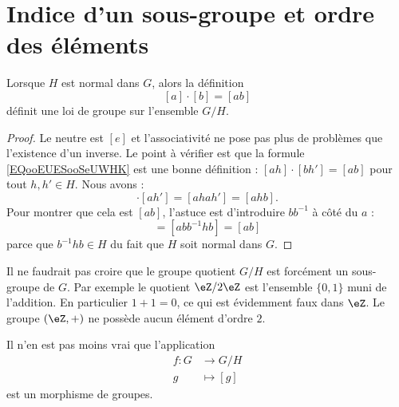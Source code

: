 \section{Indice d'un sous-groupe et ordre des éléments}

\begin{lemma}       \label{LEMooFNVRooRCkjLc}
    Lorsque \( H\) est normal dans \( G\), alors la définition
    \begin{equation}        \label{EQooEUESooSeUWHK}
        [a]\cdot[b]=[ab]
    \end{equation}
    définit une loi de groupe sur l'ensemble \( G/H\).
\end{lemma}

\begin{proof}
    Le neutre est \( [e]\) et l'associativité ne pose pas plus de problèmes que l'existence d'un inverse. Le point à vérifier est que la formule \eqref{EQooEUESooSeUWHK} est une bonne définition : \( [ah]\cdot [bh']=[ab]\) pour tout \( h,h'\in H\). Nous avons :
    \begin{equation}
        [ah]\cdot [ah']=[ahah']=[ahb].
    \end{equation}
    Pour montrer que cela est \( [ab]\), l'astuce est d'introduire \( bb^{-1}\) à côté du \( a\) :
    \begin{equation}
        [ahb]=[abb^{-1}hb]=[ab]
    \end{equation}
    parce que \( b^{-1} hb\in H\) du fait que \( H\) soit normal dans \( G\).
\end{proof}

\begin{example}      \label{EXooFNIKooHxePSs}
    Il ne faudrait pas croire que le groupe quotient \( G/H\) est forcément un sous-groupe de \( G\). Par exemple le quotient \( \eZ/2\eZ\) est l'ensemble \( \{ 0,1 \}\) muni de l'addition. En particulier \( 1+1=0\), ce qui est évidemment faux dans \( \eZ\). Le groupe \( (\eZ,+)\) ne possède aucun élément d'ordre \( 2\).

    Il n'en est pas moins vrai que l'application
    \begin{equation}
        \begin{aligned}
            f\colon G&\to G/H \\
            g&\mapsto [g]
        \end{aligned}
    \end{equation}
    est un morphisme de groupes.
\end{example}

